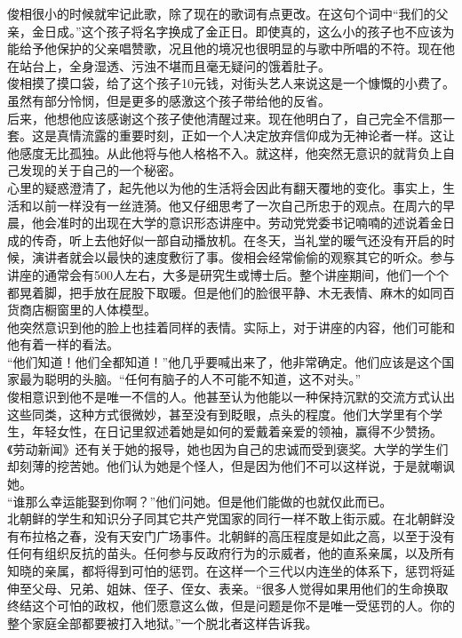 俊相很小的时候就牢记此歌，除了现在的歌词有点更改。在这句个词中“我们的父亲，金日成。”这个孩子将名字换成了金正日。即使真的，这么小的孩子也不应该为能给予他保护的父亲唱赞歌，况且他的境况也很明显的与歌中所唱的不符。现在他在站台上，全身湿透、污浊不堪而且毫无疑问的饿着肚子。\\

俊相摸了摸口袋，给了这个孩子10元钱，对街头艺人来说这是一个慷慨的小费了。虽然有部分怜悯，但是更多的感激这个孩子带给他的反省。\\

后来，他想他应该感谢这个孩子使他清醒过来。现在他明白了，自己完全不信那一套。这是真情流露的重要时刻，正如一个人决定放弃信仰成为无神论者一样。这让他感度无比孤独。从此他将与他人格格不入。就这样，他突然无意识的就背负上自己发现的关于自己的一个秘密。\\

心里的疑惑澄清了，起先他以为他的生活将会因此有翻天覆地的变化。事实上，生活和以前一样没有一丝涟漪。他又仔细思考了一次自己所忠于的观点。在周六的早晨，他会准时的出现在大学的意识形态讲座中。劳动党党委书记喃喃的述说着金日成的传奇，听上去他好似一部自动播放机。在冬天，当礼堂的暖气还没有开启的时候，演讲者就会以最快的速度敷衍了事。俊相会经常偷偷的观察其它的听众。参与讲座的通常会有500人左右，大多是研究生或博士后。整个讲座期间，他们一个个都晃着脚，把手放在屁股下取暖。但是他们的脸很平静、木无表情、麻木的如同百货商店橱窗里的人体模型。\\

他突然意识到他的脸上也挂着同样的表情。实际上，对于讲座的内容，他们可能和他有着一样的看法。\\

“他们知道！他们全都知道！”他几乎要喊出来了，他非常确定。他们应该是这个国家最为聪明的头脑。“任何有脑子的人不可能不知道，这不对头。”\\

俊相意识到他不是唯一不信的人。他甚至认为他能以一种保持沉默的交流方式认出这些同类，这种方式很微妙，甚至没有到眨眼，点头的程度。他们大学里有个学生，年轻女性，在日记里叙述着她是如何的爱戴着亲爱的领袖，赢得不少赞扬。《劳动新闻》还有关于她的报导，她也因为自己的忠诚而受到褒奖。大学的学生们却刻薄的挖苦她。他们认为她是个怪人，但是因为他们不可以这样说，于是就嘲讽她。\\

“谁那么幸运能娶到你啊？”他们问她。但是他们能做的也就仅此而已。\\

北朝鲜的学生和知识分子同其它共产党国家的同行一样不敢上街示威。在北朝鲜没有布拉格之春，没有天安门广场事件。北朝鲜的高压程度是如此之高，以至于没有任何有组织反抗的苗头。任何参与反政府行为的示威者，他的直系亲属，以及所有知晓的亲属，都将得到可怕的惩罚。在这样一个三代以内连坐的体系下，惩罚将延伸至父母、兄弟、姐妹、侄子、侄女、表亲。“很多人觉得如果用他们的生命换取终结这个可怕的政权，他们愿意这么做，但是问题是你不是唯一受惩罚的人。你的整个家庭全部都要被打入地狱。”一个脱北者这样告诉我。\\

